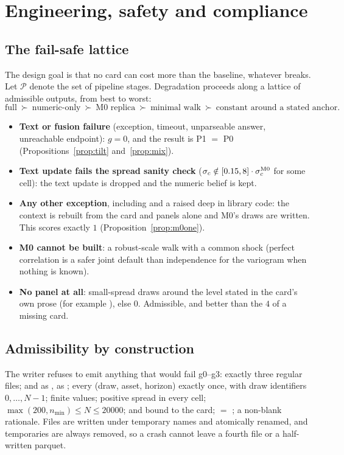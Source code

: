 \section{Engineering, safety and compliance}\label{sec:engineering}

\subsection{The fail-safe lattice}

The design goal is that no card can cost more than the baseline, whatever breaks. Let $\mathcal P$ denote the set of pipeline stages. Degradation
proceeds along a lattice of admissible outputs, from best to worst:
\begin{equation*}
  \text{full}\ \succ\ \text{numeric-only}\ \succ\ \text{M0 replica}\ \succ\ \text{minimal walk}\ \succ\ \text{constant around a stated anchor}.
\end{equation*}
\begin{itemize}[leftmargin=*]
\item \textbf{Text or fusion failure} (exception, timeout, unparseable answer, unreachable endpoint): $g=0$, and the result is P1 $=$ P0
(Propositions~\ref{prop:tilt} and~\ref{prop:mix}).
\item \textbf{Text update fails the spread sanity check} ($\sigma_c\notin[0.15,8]\cdot\sigma^{\mathrm{M0}}_c$ for some cell): the text update is dropped
and the numeric belief is kept.
\item \textbf{Any other exception}, including  and a  raised deep in library code: the context is rebuilt
from the card and panels alone and M0's draws are written. This scores exactly $1$ (Proposition~\ref{prop:m0one}).
\item \textbf{M0 cannot be built}: a robust-scale walk with a common shock (perfect correlation is a safer joint default than independence for the
variogram when nothing is known).
\item \textbf{No panel at all}: small-spread draws around the level stated in the card's own prose (for example ), else $0$.
Admissible, and better than the $4$ of a missing card.
\end{itemize}

\subsection{Admissibility by construction}

The writer refuses to emit anything that would fail g0--g3: exactly three regular files;  and  as ,
 as ; every (draw, asset, horizon) exactly once, with draw identifiers $0,\dots,N-1$; finite values; positive spread in every cell;
$\max(200,n_{\min})\le N\le20000$;  and  bound to the card;  $=$ ; a non-blank rationale.
Files are written under temporary names and atomically renamed, and temporaries are always removed, so a crash cannot leave a fourth file or a
half-written parquet.

